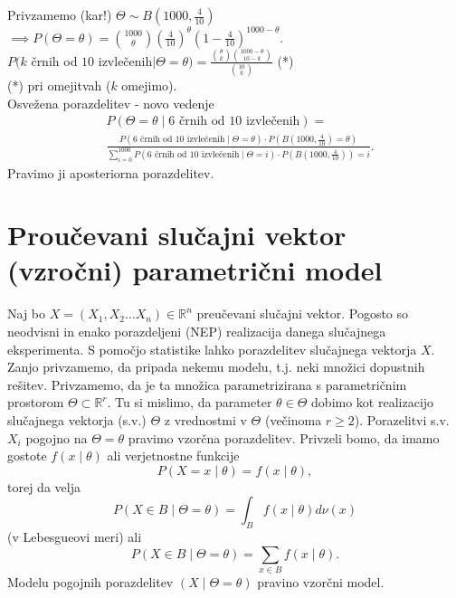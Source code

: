 \documentclass[a4paper, 12pt]{book}
\theoremstyle{definition}
\theoremstyle{remark}
\newcommand{\R}{\mathbb{R}}
\begin{document}
Privzamemo (kar!) $\Theta \sim B\left(1000, \frac{4}{10}\right)$ \\
$\implies P(\Theta = \theta) = \binom{1000}{\theta} \left(\frac{4}{10}\right)^{\theta} \left(1-\frac{4}{10}\right)^{1000-\theta}$. \\
$P(k$ črnih od $10$ izvlečenih$ \mid \Theta = \theta) = \frac{\binom{\theta}{k} \binom{1000-\theta}{10-k}}{\binom{10}{k}}$ (*) \\
(*) pri omejitvah ($k$ omejimo). \\
Osvežena porazdelitev - novo vedenje \\
\begin{align*}
  &P(\Theta = \theta \mid 6 \text{ črnih od } 10 \text{ izvlečenih}) = \\
  &\frac{P(6 \text{ črnih od } 10 \text{ izvlečenih} \mid \Theta = \theta) \cdot P(B(1000, \frac{4}{10}) = \theta)}
    {\sum_{i=0}^{1000} P(6 \text{ črnih od } 10 \text{ izvlečenih} \mid \Theta = i) \cdot P(B(1000, \frac{4}{10})) = i}.
\end{align*}
Pravimo ji aposteriorna porazdelitev.


\section{Proučevani slučajni vektor (vzročni) parametrični model}

Naj bo $X = (X_1, X_2 \dots X_n) \in \R^n$ preučevani slučajni vektor.
Pogosto so neodvisni in enako porazdeljeni (NEP) realizacija danega slučajnega eksperimenta.
S pomočjo statistike lahko  porazdelitev slučajnega vektorja $X$.
Zanjo privzamemo, da pripada nekemu modelu, t.j. neki množici dopustnih rešitev.
Privzamemo, da je ta množica parametrizirana s parametričnim prostorom $\Theta \subset \R^r$.
Tu si mislimo, da parameter $\theta \in \Theta$ dobimo kot realizacijo slučajnega vektorja (s.v.) $\Theta$
z vrednostmi v $\Theta$ (večinoma $r \geq 2$).
Porazelitvi s.v. $X_i$ pogojno na $\Theta = \theta$ pravimo vzorčna porazdelitev.
Privzeli bomo, da imamo gostote $f(x \mid \theta)$ ali verjetnostne funkcije
\begin{equation*}
  P(X = x \mid \theta) = f(x \mid \theta),
\end{equation*}
torej da velja
\begin{equation*}
  P(X \in B \mid \Theta = \theta) = \int_B f(x \mid \theta) d\nu (x)
\end{equation*}
(v Lebesgueovi meri) ali
\begin{equation*}
  P(X \in B \mid \Theta = \theta) = \sum_{x \in B} f(x \mid \theta).
\end{equation*}
Modelu pogojnih porazdelitev $(X \mid \Theta = \theta)$ pravino vzorčni model.
\end{document}
